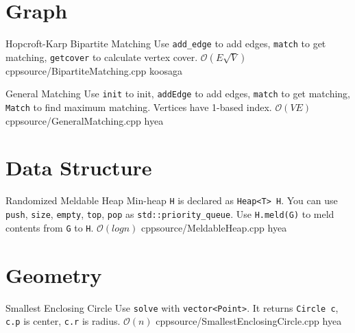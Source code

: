 \documentclass[landscape, 10pt, a4paper, oneside, twocolumn]{extarticle}
\begin{document}
\maketitlepage



\section{Graph}

\Algorithm
{Hopcroft-Karp Bipartite Matching}
{Use \texttt{add\_edge} to add edges, \texttt{match} to get matching, \texttt{getcover} to calculate vertex cover.}
{$\mathcal{O}(E \sqrt{V})$}
{cpp}{source/BipartiteMatching.cpp}
{koosaga}


\Algorithm
{General Matching}
{Use \texttt{init} to init, \texttt{addEdge} to add edges, \texttt{match} to get matching, \texttt{Match} to find maximum matching. Vertices have 1-based index.}
{$\mathcal{O}(VE)$}
{cpp}{source/GeneralMatching.cpp}
{hyea}

\section{Data Structure}

\Algorithm
{Randomized Meldable Heap}
{Min-heap \texttt{H} is declared as \texttt{Heap<T> H}. You can use \texttt{push}, \texttt{size}, \texttt{empty}, \texttt{top}, \texttt{pop} as \texttt{std::priority\_queue}. Use \texttt{H.meld(G)} to meld contents from \texttt{G} to \texttt{H}. }
{$\mathcal{O}(log n)$}
{cpp}{source/MeldableHeap.cpp}
{hyea}

\section{Geometry}

\Algorithm
{Smallest Enclosing Circle}
{Use \texttt{solve} with \texttt{vector<Point>}. It returns \texttt{Circle c}, \texttt{c.p} is center, \texttt{c.r} is radius.}
{$\mathcal{O}(n)$}
{cpp}{source/SmallestEnclosingCircle.cpp}
{hyea}
\end{document}
